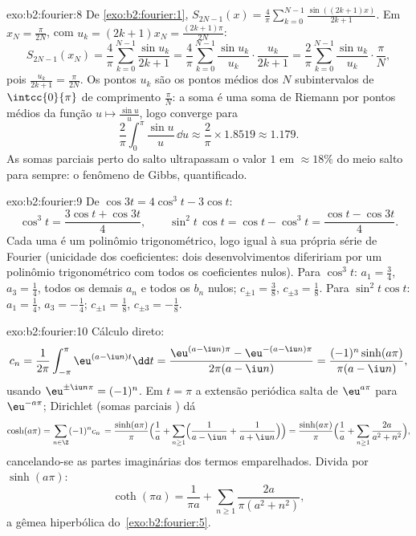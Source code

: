 \begin{solution}{exo:b2:fourier:8}
De \cref{exo:b2:fourier:1}, $S_{2N-1}(x) =
\frac4\pi\sum_{k=0}^{N-1}\frac{\sin((2k+1)x)}{2k+1}$. Em $x_N =
\frac{\pi}{2N}$, com $u_k = (2k+1)x_N = \frac{(2k+1)\pi}{2N}$:
\[
S_{2N-1}(x_N) = \frac{4}{\pi}\sum_{k=0}^{N-1}\frac{\sin u_k}{2k+1}
= \frac{4}{\pi}\sum_{k=0}^{N-1}\frac{\sin u_k}{u_k}\cdot
\frac{u_k}{2k+1}
= \frac{2}{\pi}\sum_{k=0}^{N-1}\frac{\sin u_k}{u_k}\cdot
\frac{\pi}{N},
\]
pois $\frac{u_k}{2k+1} = \frac{\pi}{2N}$. Os pontos $u_k$ são os
pontos médios dos $N$ subintervalos de $\intcc{0}{\pi}$ de comprimento
$\frac{\pi}{N}$: a soma é uma soma de Riemann por pontos médios da
função  $u \mapsto \frac{\sin u}{u}$, logo converge para
\[
\frac{2}{\pi}\int_0^\pi \frac{\sin u}{u}\,\dd u
\approx \frac{2}{\pi}\times 1.8519 \approx 1.179 .
\]
As somas parciais perto do salto ultrapassam o valor $1$ em $\approx
18\%$ do meio salto para sempre: o fenômeno de Gibbs, quantificado.
\end{solution}

\begin{solution}{exo:b2:fourier:9}
De $\cos 3t = 4\cos^3t - 3\cos t$:
\[
\cos^3 t = \frac{3\cos t + \cos 3t}{4},
\qquad
\sin^2t\,\cos t = \cos t - \cos^3 t
= \frac{\cos t - \cos 3t}{4} .
\]
Cada uma é um polinômio trigonométrico, logo igual à sua própria
série de Fourier (unicidade dos coeficientes: dois desenvolvimentos
difeririam por um polinômio trigonométrico com todos os
coeficientes nulos). Para $\cos^3t$: $a_1 = \frac34$, $a_3 =
\frac14$, todos os demais $a_n$ e todos os $b_n$ nulos; $c_{\pm1} =
\frac38$, $c_{\pm3} = \frac18$. Para $\sin^2t\cos t$: $a_1 =
\frac14$, $a_3 = -\frac14$; $c_{\pm1} = \frac18$, $c_{\pm3} =
-\frac18$.
\end{solution}

\begin{solution}{exo:b2:fourier:10}
Cálculo direto:
\[
c_n = \frac{1}{2\pi}\int_{-\pi}^{\pi}\eu^{(a - \iu n)t}\dd t
= \frac{\eu^{(a-\iu n)\pi} - \eu^{-(a - \iu n)\pi}}
{2\pi(a - \iu n)}
= \frac{(-1)^n\sinh(a\pi)}{\pi(a - \iu n)} ,
\]
usando $\eu^{\pm\iu n\pi} = (-1)^n$. Em $t = \pi$ a extensão
periódica salta de $\eu^{a\pi}$ para $\eu^{-a\pi}$; Dirichlet
(somas parciais ) dá
\[
\cosh(a\pi) = \sum_{n\in\Z}(-1)^n c_n\,
= \frac{\sinh(a\pi)}{\pi}\Bigl(\frac1a +
\sum_{n\geq1}\Bigl(\frac{1}{a - \iu n} +
\frac{1}{a + \iu n}\Bigr)\Bigr)
= \frac{\sinh(a\pi)}{\pi}\Bigl(\frac1a +
\sum_{n\geq1}\frac{2a}{a^2 + n^2}\Bigr) ,
\]
cancelando-se as partes imaginárias dos termos emparelhados. Divida por
$\sinh(a\pi)$:
\[
\coth(\pi a) = \frac{1}{\pi a} +
\sum_{n\geq1}\frac{2a}{\pi(a^2 + n^2)} ,
\]
a gêmea hiperbólica do~\cref{exo:b2:fourier:5}.
\end{solution}

